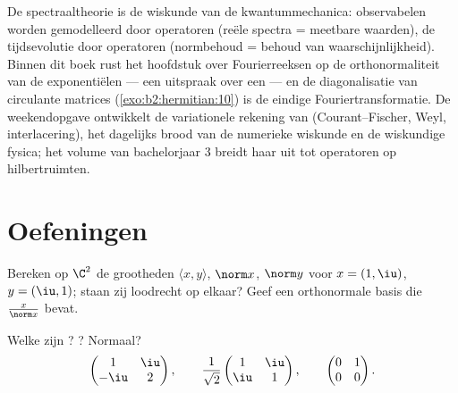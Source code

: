 \begin{remark}
De  spectraaltheorie is de wiskunde van de
kwantummechanica: observabelen worden gemodelleerd door
 operatoren (reële spectra = meetbare waarden), de
tijdsevolutie door  operatoren (normbehoud = behoud van
waarschijnlijkheid). Binnen dit boek rust het hoofdstuk over
Fourierreeksen op de orthonormaliteit van de exponentiëlen --- een
uitspraak over een  --- en de diagonalisatie
van circulante matrices (\cref{exo:b2:hermitian:10}) is de eindige
Fouriertransformatie. De weekendopgave ontwikkelt de variationele
rekening van  (Courant--Fischer, Weyl, interlacering),
het dagelijks brood van de numerieke wiskunde en de wiskundige
fysica; het volume van bachelorjaar 3 breidt haar uit tot 
 operatoren op hilbertruimten.
\end{remark}

\section{Oefeningen}

\begin{exercise}[$\star$]\label{exo:b2:hermitian:1}
Bereken op $\C^2$ de grootheden $\langle x, y\rangle$, $\norm x$,
$\norm y$ voor $x = (1, \iu)$, $y = (\iu, 1)$; staan zij loodrecht
op elkaar? Geef een orthonormale basis die $\frac{x}{\norm x}$
bevat.
\end{exercise}

\begin{exercise}[$\star$]\label{exo:b2:hermitian:2}
Welke zijn ? ? Normaal?
\[
\begin{pmatrix} 1 & \iu\\ -\iu & 2 \end{pmatrix},
\qquad
\frac{1}{\sqrt2}\begin{pmatrix} 1 & \iu\\ \iu & 1\end{pmatrix},
\qquad
\begin{pmatrix} 0 & 1\\ 0 & 0 \end{pmatrix}.
\]
\end{exercise}

